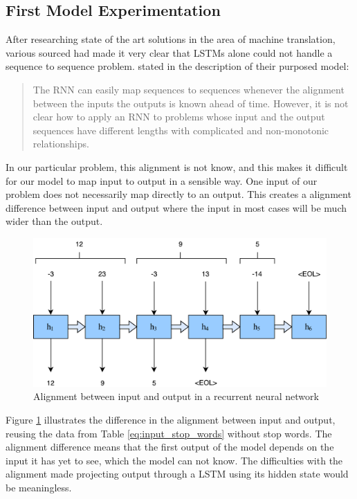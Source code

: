 \subsection{First Model Experimentation}
After researching state of the art solutions in the area of machine translation, various sourced had made it very clear that LSTMs alone could not handle a sequence to sequence problem. \citep{sutskever2014sequence} stated in the description of their purposed model:

\begin{quote}
    The RNN can easily map sequences to sequences whenever the alignment between the inputs the outputs is known ahead of time. However, it is not clear how to apply an RNN to problems whose input and the output sequences have different lengths with complicated and non-monotonic relationships.
\end{quote}

In our particular problem, this alignment is not know, and this makes it difficult for our model to map input to output in a sensible way. One input of our problem does not necessarily map directly to an output. This creates a alignment difference between input and output where the input in most cases will be much wider than the output. 

\begin{figure}[H]
    \centering
    \includegraphics[width=1\textwidth]{fig/development_process/lstm-alignment.pdf}
    \caption{Alignment between input and output in a recurrent neural network}
    \label{fig:lstm-alignment}
\end{figure}

Figure \ref{fig:lstm-alignment} illustrates the difference in the alignment between input and output, reusing the data from Table \ref{eq:input_stop_words} without stop words. The alignment difference means that the first output of the model depends on the input it has yet to see, which the model can not know.  The difficulties with the alignment made projecting output through a LSTM using its hidden state would be meaningless. 

